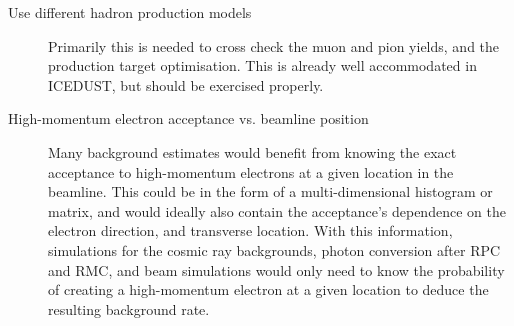 \begin{description}
	\item[Use different hadron production models] Primarily this is needed to cross check the muon and pion yields, and the production target optimisation.
		This is already well accommodated in ICEDUST, but should be exercised properly.
	\item[High-momentum electron acceptance vs. beamline position] Many background estimates would benefit from knowing the exact acceptance to high-momentum electrons at a given location in the beamline.
		This could be in the form of a multi-dimensional histogram or matrix, and would ideally also contain the acceptance's dependence on the electron direction, and transverse location.
		With this information, simulations for the cosmic ray backgrounds, photon conversion after RPC and RMC, and beam simulations would only need to know the probability of creating a high-momentum electron at a given location to deduce the resulting background rate.
\end{description}

